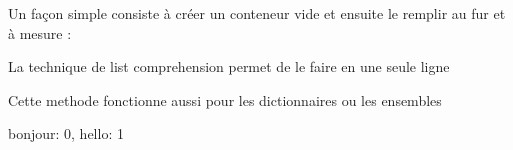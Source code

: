 \documentclass[letterpaper,10pt,english]{sphinxhowto}
\begin{document}
\sphinxAtStartPar
Un façon simple consiste à créer un conteneur vide et ensuite le remplir au fur et à mesure :

\begin{sphinxVerbatim}[commandchars=\\\{\}]
  \PYG{p}{[}   \PYG{p}{]}
  \PYG{p}{[}\PYG{p}{]}
   
\end{sphinxVerbatim}

\sphinxAtStartPar
La technique de list comprehension permet de le faire en une seule ligne

\begin{sphinxVerbatim}[commandchars=\\\{\}]
  \PYG{p}{[}    \PYG{p}{]}
\end{sphinxVerbatim}

\sphinxAtStartPar
Cette methode fonctionne aussi pour les dictionnaires ou les ensembles

\begin{sphinxVerbatim}[commandchars=\\\{\}]
  \PYG{p}{[} \PYG{p}{]}
     

     
\end{sphinxVerbatim}

\begin{sphinxVerbatim}[commandchars=\\\{\}]
\PYGZob{}\PYGZsq{}bonjour\PYGZsq{}: 0, \PYGZsq{}hello\PYGZsq{}: 1\PYGZcb{}
\end{sphinxVerbatim}
\end{document}
